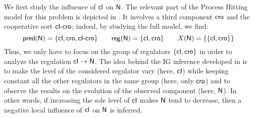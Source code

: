 We first study the influence of $\mathsf{cI}$ on $\mathsf{N}$.
The relevant part of the Process Hitting model for this problem is depicted in
.
It involves a third component $\mathsf{cro}$ and the cooperative sort $\mathsf{cI\mbox{-}cro}$;
indeed, by studying the full model, we find:
\[\mathsf{pred}(\mathsf{N}) = \{ \mathsf{cI}, \mathsf{cro}, \mathsf{cI\mbox{-}cro} \} \qquad
  \mathsf{reg}({\mathsf{N}}) = \{ \mathsf{cI}, \mathsf{cro} \} \qquad
  X(\mathsf{N}) = \{ \{ \mathsf{cI}, \mathsf{cro} \} \}\]
Thus, we only have to focus on the group of regulators $\{ \mathsf{cI}, \mathsf{cro} \}$
in order to analyze the regulation $\mathsf{cI} \rightarrow \mathsf{N}$.
The idea behind the IG inference developed in 
is to make the level of the considered regulator vary (here, $\mathsf{cI}$)
while keeping constant all the other regulators in the same group (here, only $\mathsf{cro}$)
and to observe the results on the evolution of the observed component (here, $\mathsf{N}$).
In other words, if increasing the sole level of $\mathsf{cI}$ makes $\mathsf{N}$ tend to decrease,
then a negative local influence of $\mathsf{cI}$ on $\mathsf{N}$ is inferred.

